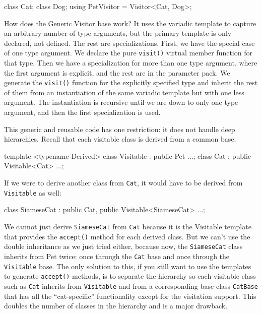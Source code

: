 \begin{code}
class Cat;
class Dog;
using PetVisitor = Visitor<Cat, Dog>;
\end{code}

How does the Generic Visitor base work? It uses the variadic template to capture an arbitrary number of type arguments, but the primary template is only declared, not defined. The rest are specializations. First, we have the special case of one type argument. We declare the pure \texttt{visit()} virtual member function for that type. Then we have a specialization for more than one type argument, where the first argument is explicit, and the rest are in the parameter pack. We generate the \texttt{visit()} function for the explicitly specified type and inherit the rest of them from an instantiation of the same variadic template but with one less argument. The instantiation is recursive until we are down to only one type argument, and then the first specialization is used.

This generic and reusable code has one restriction: it does not handle deep hierarchies. Recall that each visitable class is derived from a common base:

\begin{code}
template <typename Derived>
class Visitable : public Pet {...};
class Cat : public Visitable<Cat> {...};
\end{code}

If we were to derive another class from \texttt{Cat}, it would have to be derived from \texttt{Visitable} as well:

\begin{code}
class SiameseCat : public Cat,
                   public Visitable<SiameseCat> {...};
\end{code}

We cannot just derive \texttt{SiameseCat} from \texttt{Cat} because it is the Visitable template that provides the \texttt{accept()} method for each derived class. But we can't use the double inheritance as we just tried either, because now, the \texttt{SiameseCat} class inherits from Pet twice: once through the \texttt{Cat} base and once through the \texttt{Visitable} base. The only solution to this, if you still want to use the templates to generate \texttt{accept()} methods, is to separate the hierarchy so each visitable class such as \texttt{Cat} inherits from \texttt{Visitable} and from a corresponding base class \texttt{CatBase} that has all the ``cat-specific'' functionality except for the visitation support. This doubles the number of classes in the hierarchy and is a major drawback.

